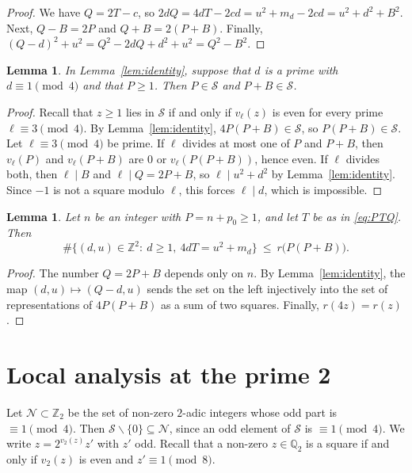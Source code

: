 \documentclass[11pt]{amsart}
\newtheorem{lemma}[theorem]{Lemma}
\theoremstyle{remark}
\theoremstyle{definition}
\numberwithin{equation}{section}
\newcommand{\Sc}{\mathcal{S}}
\newcommand{\Nc}{\mathcal{N}}
\newcommand{\Z}{\mathbb{Z}}
\newcommand{\Zt}{\mathbb{Z}_2}
\newcommand{\Q}{\mathbb{Q}}
\begin{document}
\begin{proof}
We have $Q=2T-c$, so $2dQ=4dT-2cd=u^2+m_d-2cd=u^2+d^2+B^2$. Next, $Q-B=2P$ and $Q+B=2(P+B)$. Finally, $(Q-d)^2+u^2=Q^2-2dQ+d^2+u^2=Q^2-B^2$.
\end{proof}

\begin{lemma}\label{lem:split}
In Lemma~\ref{lem:identity}, suppose that $d$ is a prime with $d\equiv1\pmod 4$ and that $P\ge1$. Then $P\in\Sc$ and $P+B\in\Sc$.
\end{lemma}

\begin{proof}
Recall that $z\ge1$ lies in $\Sc$ if and only if $v_\ell(z)$ is even for every prime $\ell\equiv3\pmod4$. By Lemma~\ref{lem:identity}, $4P(P+B)\in\Sc$, so $P(P+B)\in\Sc$. Let $\ell\equiv3\pmod 4$ be prime. If $\ell$ divides at most one of $P$ and $P+B$, then $v_\ell(P)$ and $v_\ell(P+B)$ are $0$ or $v_\ell(P(P+B))$, hence even. If $\ell$ divides both, then $\ell\mid B$ and $\ell\mid Q=2P+B$, so $\ell\mid u^2+d^2$ by Lemma~\ref{lem:identity}. Since $-1$ is not a square modulo $\ell$, this forces $\ell\mid d$, which is impossible.
\end{proof}

\begin{lemma}\label{lem:mult}
Let $n$ be an integer with $P=n+p_0\ge1$, and let $T$ be as in \eqref{eq:PTQ}. Then
\[
\#\bigl\{(d,u)\in\Z^2:\ d\ge1,\ 4dT=u^2+m_d\bigr\}\ \le\ r\bigl(P(P+B)\bigr).
\]
\end{lemma}

\begin{proof}
The number $Q=2P+B$ depends only on $n$. By Lemma~\ref{lem:identity}, the map $(d,u)\mapsto(Q-d,u)$ sends the set on the left injectively into the set of representations of $4P(P+B)$ as a sum of two squares. Finally, $r(4z)=r(z)$.
\end{proof}

\section{Local analysis at the prime 2}\label{sec:2adic}

Let $\Nc\subset\Zt$ be the set of non-zero $2$-adic integers whose odd part is $\equiv1\pmod 4$. Then $\Sc\smallsetminus\{0\}\subseteq\Nc$, since an odd element of $\Sc$ is $\equiv1\pmod4$. We write $z=2^{v_2(z)}z'$ with $z'$ odd. Recall that a non-zero $z\in\Q_2$ is a square if and only if $v_2(z)$ is even and $z'\equiv1\pmod 8$.
\end{document}
